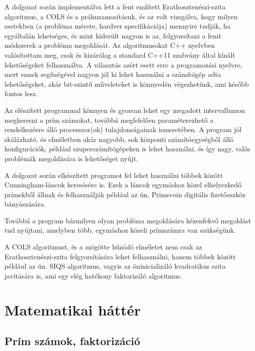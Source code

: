\documentclass[twoside, a4paper, 12pt]{article}
\begin{document}
A dolgozat során implementálva lett a fent említett Erathosztenészi-szita algoritmus, a COLS és a práhuzamosításuk, és az volt vizsgálva, hogy milyen esetekben (a probléma mérete, hardver specifikációja) mennyire tudják, ha egyáltalán lehetséges, és mint kiderült nagyon is az, felgyorsítani a fenit módszerek a probléma megoldását. Az algoritmusokat C++ nyelvben valósítottam meg, csak és kizárólag a standard C++11 szabvány által kínált lehetőségeket felhasználva. A választás azért esett erre a programozási nyelvre, mert ennek segítségével nagyon jól ki lehet használni a számítógép adta lehetőségeket, akár bit-szintű műveleteket is könnyedén végezhetünk, ami később fontos lesz. \par \bigskip
Az elészített programmal könnyen és gyorsan lehet egy megadott intervallumon megkeresni a prím számokat, továbbá megfelelően paraméterezhető a rendelkezésre álló processzor(ok) tulajdonságainak ismeretében. A program jól skálázható, és elméletben akár nagyobb, sok központi számítóegységből álló konfigurációk, például szuperszámítógépeken is lehet használni, és így nagy, valós problémák megoldására is lehetőséget nyújt. \par \bigskip
A dolgozat során elkészített programot fel lehet használni többek között Cunningham-láncok keresésére is. Ezek a láncok egymáshoz közel elhelyezkedő prímekből állnak és felhasználják például az ún. Primecoin digitális fizetőeszköz bányászására. \par \cite{cunn} \cite{primecoin}
Továbbá a program bármilyen olyan probléma megoldására kézenfekvő megoldást tud nyújtani, amelyben több, egymáshoz közeli prímszámra van szükségünk. \par 
\bigskip
A COLS algoritmust, és a mögötte húzódó elméletet nem csak az Erathosztenészi-szita felgyorsítására lehet felhasználni, hanem többek között például az ún. SIQS algoritmus, vagyis az öninicializáló kvadratikus szita javítására is, ami egy elég hatékony faktorizáló algoritmus. \par \cite{siqs}

\clearpage
\section{Matematikai háttér}

\subsection{Prím számok, faktorizáció}
\end{document}
